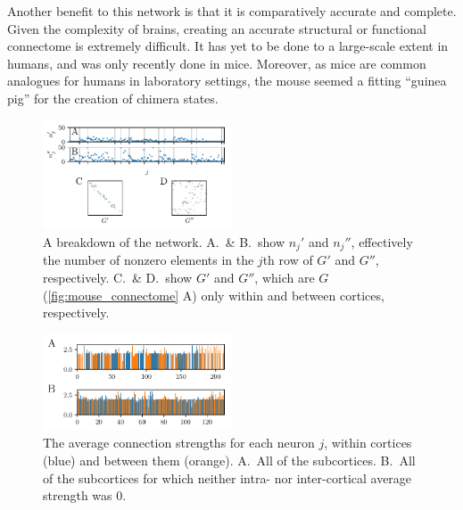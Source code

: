 Another benefit to this network is that it is comparatively accurate and complete.
Given the complexity of brains, creating an accurate structural or functional connectome is extremely difficult.
It has yet to be done to a large-scale extent in humans, and was only recently done in mice.
Moreover, as mice are common analogues for humans in laboratory settings, the mouse seemed a fitting ``guinea pig'' for the creation of chimera states.

\begin{figure}[ht]
  \centering
  \includegraphics[width=0.5\textwidth]{figure/primes_100dpi.pdf}
  \caption[Network breakdown]{A breakdown of the network.
    A.\ \& B.\ show $n_{j}'$ and $n_{j}''$, effectively the number of nonzero elements in the $j$th row of $G'$ and $G''$, respectively.
    C.\ \& D.\ show $G'$ and $G''$, which are $G$ (\cref{fig:mouse_connectome} A) only within and between cortices, respectively.
  }
  \label{fig:primes}
\end{figure}

\begin{figure}[ht]
  \centering
  \includegraphics[width=0.5\textwidth]{figure/g_over_n_100dpi.pdf}
  \caption[Average strengths]{The average connection strengths for each neuron $j$, within cortices (blue) and between them (orange).
    A.\ All of the subcortices.
    B.\ All of the subcortices for which neither intra- nor inter-cortical average strength was 0.
  }
  \label{fig:average_strengths}
\end{figure}

